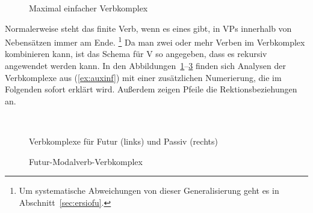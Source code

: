 \begin{exe}
  \ex\label{ex:auxinf}
  \begin{xlist}
  \end{xlist}
\end{exe}

\begin{figure}[!htbp]
  \centering
  \caption{Maximal einfacher Verbkomplex}
  \label{fig:vkomplex0}
\end{figure}

Normalerweise steht das finite Verb, wenn es eines gibt, in VPs innerhalb von Nebensätzen immer am Ende.%
\footnote{Um systematische Abweichungen von dieser Generalisierung geht es in Abschnitt~\ref{sec:ersiofu}.}
Da man zwei oder mehr Verben im Verbkomplex kombinieren kann, ist das Schema für V so angegeben, dass es rekursiv angewendet werden kann.
In den Abbildungen~\ref{fig:vkomplex0}--\ref{fig:vkomplex3} finden sich Analysen der Verbkomplexe aus (\ref{ex:auxinf}) mit einer zusätzlichen Numerierung, die im Folgenden sofort erklärt wird.
Außerdem zeigen Pfeile die Rektionsbeziehungen an.

\begin{figure}[!htbp]
  \centering
  ~
  \vspace{0.3cm}
  \caption{Verbkomplexe für Futur (links) und Passiv (rechts)}
  \label{fig:vkomplex2}
\end{figure}

\begin{figure}[!htbp]
  \centering
  \vspace{0.3cm}
  \caption{Futur-Modalverb-Verbkomplex}
  \label{fig:vkomplex3}
\end{figure}

